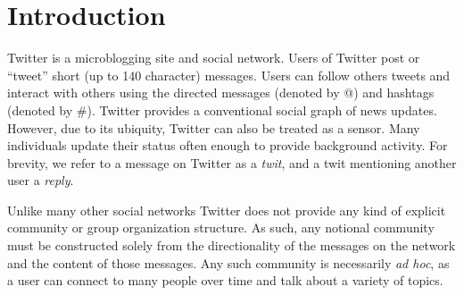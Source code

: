 \section{Introduction}

Twitter is a microblogging site and social network.  Users of Twitter post or ``tweet'' short (up to 140 character) messages.  Users can follow others tweets and interact with others using the directed messages (denoted by @) and hashtags (denoted by \#). Twitter provides a conventional social graph of news updates.  However, due to its ubiquity, Twitter can also be treated as a sensor.  Many individuals update their status often enough to provide background activity.  For brevity, we refer to a message on Twitter as a \emph{twit}, and a twit mentioning another user a \emph{reply}.

Unlike many other social networks Twitter does not provide any kind of explicit community or group organization structure.  As such, any notional community must be constructed solely from the directionality of the messages on the network and the content of those messages.  Any such community is necessarily \emph{ad hoc}, as a user can connect to many people over time and talk about a variety of topics.
